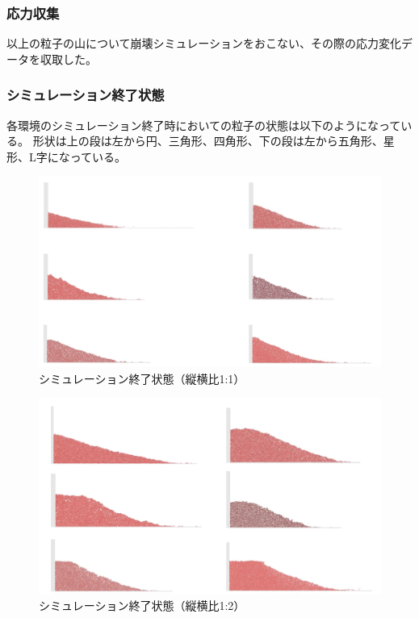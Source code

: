 \documentclass[12pt]{ltjsarticle}
\begin{document}
\subsubsection{応力収集}
以上の粒子の山について崩壊シミュレーションをおこない、その際の応力変化データを収取した。

\subsubsection{シミュレーション終了状態}
各環境のシミュレーション終了時においての粒子の状態は以下のようになっている。
形状は上の段は左から円、三角形、四角形、下の段は左から五角形、星形、L字になっている。

\begin{figure}[htbp]
      \centering
      \includegraphics*[keepaspectratio, scale=0.35]{1_1_nagasu.PNG}
      \caption{シミュレーション終了状態（縦横比1:1）}
    \end{figure}

\begin{figure}[htbp]
      \centering
      \includegraphics*[keepaspectratio, scale=0.35]{1_2_nagasu.PNG}
      \caption{シミュレーション終了状態（縦横比1:2）}
\end{figure}
\end{document}
